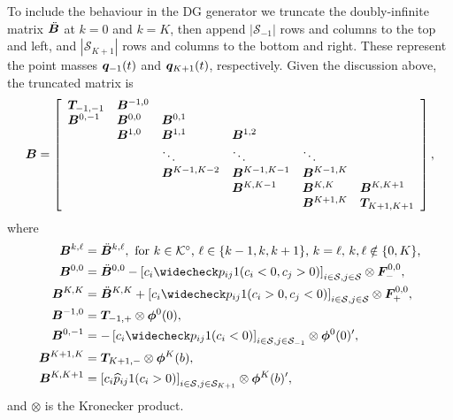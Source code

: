 To include the behaviour in the DG generator we truncate the doubly-infinite matrix \(\ddot{{\boldsymbol B}}\) at \(k=0\) and \(k=K\), then append \(|\mathcal S_{-1}|\) rows and columns to the top and left, and \(|\mathcal S_{K+1}|\) rows and columns to the bottom and right. These represent the point masses \(\boldsymbol q_{-1}(t)\) and \(\boldsymbol q_{K+1}(t)\), respectively. Given the discussion above, the truncated matrix is
\[{{\boldsymbol B}} = \left[\begin{array}{llllll}
	\boldsymbol T_{{-1},{-1}}& {{\boldsymbol B}}^{{-1},0} & & & & \\
	{{\boldsymbol B}}^{0,{-1}} & {{\boldsymbol B}}^{0,0} & {{\boldsymbol B}}^{0,1} & & & \\
	& {{\boldsymbol B}}^{1,0} & {{\boldsymbol B}}^{1,1} & {{\boldsymbol B}}^{1,2} & & \\
	& & \ddots & \ddots & \ddots & \\
	& & {{\boldsymbol B}}^{K-1,K-2} &{{\boldsymbol B}}^{K-1,K-1} & {{\boldsymbol B}}^{K-1,K} & \\
	& & &{{\boldsymbol B}}^{K,K-1} & {{\boldsymbol B}}^{K,K} & {{\boldsymbol B}}^{K,{K+1}} \\
	& & & & {{\boldsymbol B}}^{{K+1}, K} & \boldsymbol T_{{K+1},{K+1}}
\end{array}\right],\]
where 
\begin{align*}
	{{\bs B}}^{k,\ell} &= \ddot{{\bs B}}^{k,\ell}, \mbox{ for \(k\in\mathcal K^\circ\), \(\ell\in\{k-1,k,k+1\}\), \(k=\ell,\, k,\ell\notin \{0,K\}\),}
	\\ \bs B^{0,0} &= \ddot{\bs B}^{0,0} - \left[c_i\widecheck p_{ij}1(c_i<0, c_j>0)\right]_{i\in\calS,j\in\calS}\otimes \bs F_-^{0,0},
	\\ \bs B^{K,K} &= \ddot{\bs B}^{K,K} + \left[c_i\widecheck p_{ij} 1(c_i>0, c_j<0)\right]_{i\in\calS,j\in\calS}\otimes \bs F_+^{0,0}, 
	\\ {{\bs B}}^{{-1},0} &= \bs T_{{-1},+}\otimes \boldsymbol\phi^0(0), 
	\\ {{\bs B}}^{0,{-1}} &=-\left[c_i \widecheck p_{ij}  1{(c_i<0)}\right]_{i\in\calS,j\in\calS_{{-1}}} \otimes \boldsymbol \phi^0(0)\tr{}, 
	\\ {{\bs B}}^{{K+1}, K} &= \bs T_{{K+1},-}\otimes \boldsymbol\phi^K(b),
	\\ {{\bs B}}^{K,{K+1}} &= \left[c_i\widehat p_{ij}  1{(c_i>0)}\right]_{i\in\calS,j\in\calS_{K+1}} \otimes \boldsymbol \phi^K(b)\tr{},
\end{align*} 
and \(\otimes\) is the Kronecker product. 

